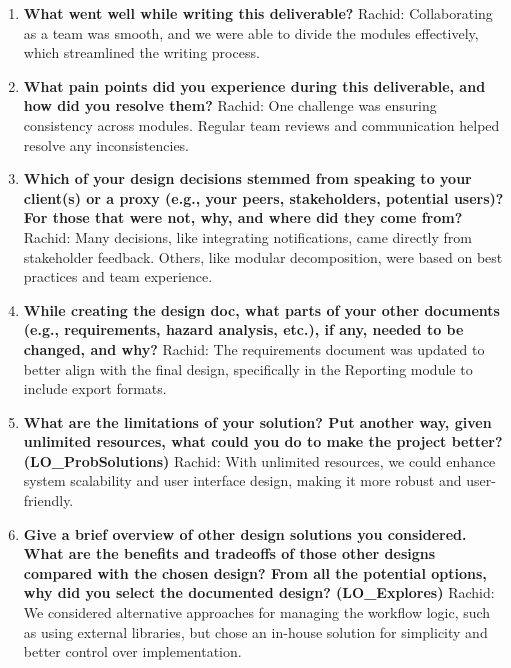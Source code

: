 \documentclass[12pt, titlepage]{article}
\begin{document}
\begin{enumerate}
  \item \textbf{What went well while writing this deliverable?}  
  \newline
  Rachid: Collaborating as a team was smooth, and we were able to divide the modules effectively, which streamlined the writing process.

  \item \textbf{What pain points did you experience during this deliverable, and how did you resolve them?}  
  \newline
  Rachid: One challenge was ensuring consistency across modules. Regular team reviews and communication helped resolve any inconsistencies.

  \item \textbf{Which of your design decisions stemmed from speaking to your client(s) or a proxy (e.g., your peers, stakeholders, potential users)? For those that were not, why, and where did they come from?}  
  \newline
  Rachid: Many decisions, like integrating notifications, came directly from stakeholder feedback. Others, like modular decomposition, were based on best practices and team experience.

  \item \textbf{While creating the design doc, what parts of your other documents (e.g., requirements, hazard analysis, etc.), if any, needed to be changed, and why?}  
  \newline
  Rachid: The requirements document was updated to better align with the final design, specifically in the Reporting module to include export formats.

  \item \textbf{What are the limitations of your solution? Put another way, given unlimited resources, what could you do to make the project better? (LO\_ProbSolutions)}  
  \newline
  Rachid: With unlimited resources, we could enhance system scalability and user interface design, making it more robust and user-friendly.

  \item \textbf{Give a brief overview of other design solutions you considered. What are the benefits and tradeoffs of those other designs compared with the chosen design? From all the potential options, why did you select the documented design? (LO\_Explores)}  
  \newline
  Rachid: We considered alternative approaches for managing the workflow logic, such as using external libraries, but chose an in-house solution for simplicity and better control over implementation.
\end{enumerate}
\end{document}
